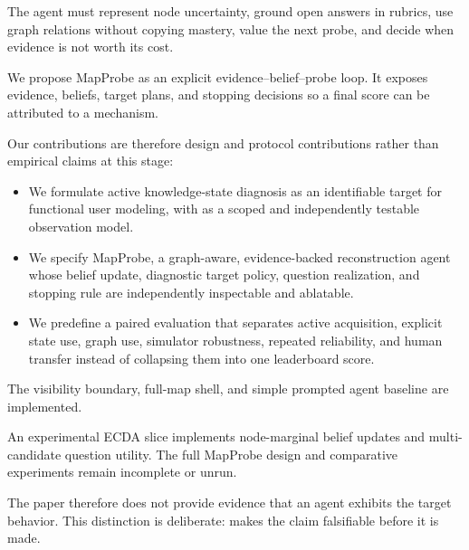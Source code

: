 The agent must represent node uncertainty, ground open answers in rubrics, use graph relations without
copying mastery, value the next probe, and decide when evidence is not worth its cost.

We propose MapProbe as an explicit evidence--belief--probe loop. It exposes evidence, beliefs, target
plans, and stopping decisions so a final score can be attributed to a mechanism.

Our contributions are therefore design and protocol contributions rather than empirical claims at this stage:

\begin{itemize}[leftmargin=1.5em]
    \item We formulate active knowledge-state diagnosis as an identifiable target for functional user modeling, with \sagesim as a scoped and independently testable observation model.
    \item We specify MapProbe, a graph-aware, evidence-backed reconstruction agent whose belief update, diagnostic target policy, question realization, and stopping rule are independently inspectable and ablatable.
    \item We predefine a paired evaluation that separates active acquisition, explicit state use, graph use, simulator robustness, repeated reliability, and human transfer instead of collapsing them into one leaderboard score.
\end{itemize}

The visibility boundary, full-map shell, and simple prompted agent baseline are implemented.

An experimental ECDA slice implements node-marginal belief updates and multi-candidate question
utility. The full MapProbe design and comparative experiments remain incomplete or unrun.

The paper therefore does not provide evidence that an agent exhibits the target behavior. This
distinction is deliberate: \knowact makes the claim falsifiable before it is made.
